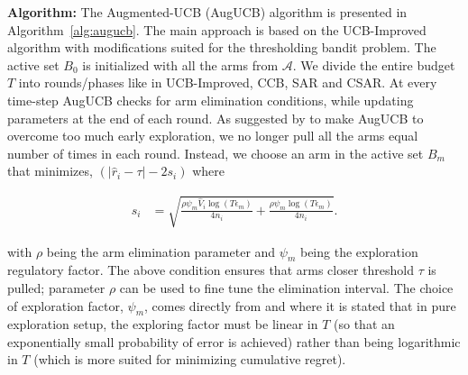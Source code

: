 \label{notation}

\textbf{Algorithm:} The Augmented-UCB (AugUCB) algorithm is presented in Algorithm~\ref{alg:augucb}.
The main approach is based on the UCB-Improved algorithm with modifications suited for the thresholding bandit problem. The active set $B_{0}$ is initialized with all the arms from $\mathcal{A}$. We divide the entire budget $T$ into rounds/phases like in UCB-Improved, CCB, SAR and CSAR. At every time-step AugUCB checks for arm elimination conditions, while updating parameters at the end of each round. As suggested by \cite{liu2016modification} to make AugUCB to overcome too much early exploration, we no longer pull all the arms equal number of times in each round. Instead, we choose an arm in the active set $B_m$ that minimizes, $(|\hat{r}_{i} - \tau |-2s_i)$ where 
\begin{small}
\begin{align*}
s_i & = \sqrt{\frac{\rho\psi_m \hat{V}_{i} \log ( T \epsilon_{m})}{4 n_{i}} + \frac{\rho\psi_m \log{( T\epsilon_{m})}}{4 n_{i}}}.
\end{align*}
\end{small} with $\rho$ being the arm elimination parameter and $\psi_{m}$ being the exploration regulatory factor.
The above condition ensures that arms closer threshold $\tau$ is pulled; 
parameter $\rho$ can be used to fine tune the elimination interval.
The choice of exploration factor, $\psi_m$,
comes directly from \cite{audibert2010best} and \cite{bubeck2011pure} where it is  stated that in pure exploration setup, the exploring factor must be linear in $T$ (so that an exponentially small probability of error is achieved) rather than being logarithmic in $T$ (which is more suited for minimizing cumulative regret).

